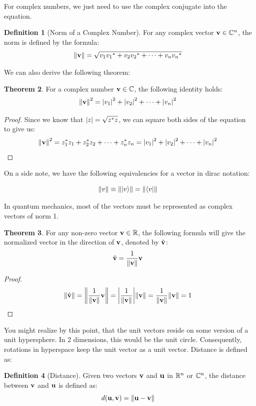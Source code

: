 \documentclass[12pt]{article}
\theoremstyle{definition}
\newtheorem{theorem}{Theorem}[section]
\newtheorem{definition}[theorem]{Definition}
\begin{document}
For complex numbers, we just need to use the complex conjugate into the equation. 

\begin{definition}[Norm of a Complex Number]
    For any complex vector $\mathbf{v} \in \mathbb{C}^n$, the norm is defined by the formula: 
    $$\norm{\mathbf{v}} = \sqrt{v_1 {v_1}^* + v_2 {v_2}^* + \cdots + v_n {v_n}^* }$$
\end{definition}

We can also derive the following theorem:

\begin{theorem}
    For a complex number $\mathbf{v} \in \mathbb{C}$, the following identity holds:
    $$\norm{\mathbf{v}}^2 = \abs{v_1}^2 + \abs{v_2}^2 + \cdots + \abs{v_n}^2$$
\end{theorem}

\begin{proof}
    Since we know that $\abs{z} = \sqrt{z^* z}$, we can square both sides of the equation to give us:
    $$\norm{\mathbf{v}}^2 = z_1^* z_1 + z_2^* z_2 + \cdots + z_n^* z_n = \abs{v_1}^2 + \abs{v_2}^2 + \cdots + \abs{v_n}^2$$
\end{proof}

On a side note, we have the following equivalencies for a vector in dirac notation:

$$\norm{v} \equiv \norm{\ket{v}} = \norm{\bra{v}}$$

In quantum mechanics, most of the vectors must be represented as complex vectors of norm 1. 

\begin{theorem}
    For any non-zero vector $\mathbf{v} \in \mathbb{R}$, the following formula will give the normalized vector in the direction of $\mathbf{v}$, denoted by $\hat{\mathbf{v}}$: $$\hat{\mathbf{v}} = \frac{1}{\norm{\mathbf{v}}}\mathbf{v}$$ 
\end{theorem}

\begin{proof}
    $$
    \norm{\hat{\mathbf{v}}} = \norm{\frac{1}{\norm{\mathbf{v}}}\mathbf{v}} = \abs{\frac{1}{\norm{\mathbf{v}}}}\norm{\mathbf{v}} = \frac{1}{\norm{\mathbf{v}}}\norm{\mathbf{v}} = 1
    $$
\end{proof}

You might realize by this point, that the unit vectors reside on some version of a unit hypersphere. In 2 dimensions, this would be the unit circle. Consequently, rotations in hyperspace keep the unit vector as a unit vector. Distance is defined as:

\begin{definition}[Distance]
    Given two vectors $\mathbf{v}$ and $\mathbf{u}$ in $\mathbb{R}^n$ or $\mathbb{C}^n$, the distance between $\mathbf{v}$ and $\mathbf{u}$ is defined as:
    $$d(\mathbf{u}, \mathbf{v}) = \norm{\mathbf{u} - \mathbf{v}}$$
\end{definition}
\end{document}
